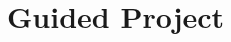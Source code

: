 \documentclass[../main.tex]{subfiles}
\begin{document}
\chapter{Guided Project}
























\printglossaries
\end{document}
